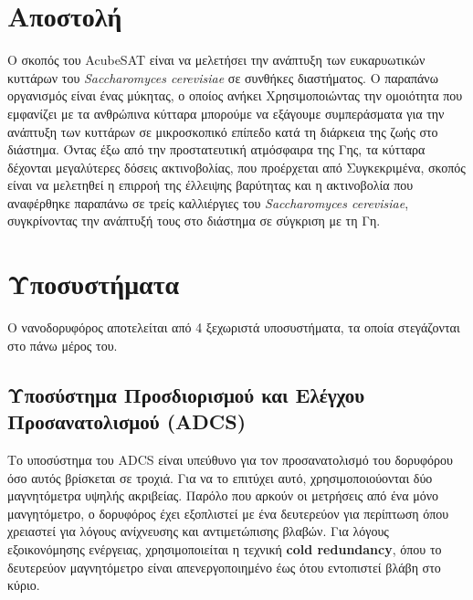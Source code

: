 \documentclass[a4paper,nobib,justified]{tufte-book}
\begin{document}
\section{Αποστολή}
Ο σκοπός του AcubeSAT είναι να μελετήσει την ανάπτυξη των ευκαρυωτικών κυττάρων του \emph{Saccharomyces cerevisiae} σε συνθήκες διαστήματος. Ο παραπάνω οργανισμός είναι ένας μύκητας, ο οποίος ανήκει %
Χρησιμοποιώντας την ομοιότητα που εμφανίζει με τα ανθρώπινα κύτταρα μπορούμε να εξάγουμε συμπεράσματα για την ανάπτυξη των κυττάρων σε μικροσκοπικό επίπεδο κατά τη διάρκεια της ζωής στο διάστημα. Όντας έξω από την προστατευτική ατμόσφαιρα της Γης, τα κύτταρα δέχονται μεγαλύτερες δόσεις ακτινοβολίας, που προέρχεται από %
Συγκεκριμένα, σκοπός είναι να μελετηθεί η επιρροή της έλλειψης βαρύτητας και η ακτινοβολία που αναφέρθηκε παραπάνω σε τρείς καλλιέργιες του \emph{Saccharomyces cerevisiae}, συγκρίνοντας την ανάπτυξή τους στο διάστημα σε σύγκριση με τη Γη.
\section{Υποσυστήματα}
Ο νανοδορυφόρος αποτελείται από 4 ξεχωριστά υποσυστήματα, τα οποία στεγάζονται στο πάνω μέρος του.
\subsection{Υποσύστημα Προσδιορισμού και Ελέγχου Προσανατολισμού (\acs{ADCS})}
Το υποσύστημα του \acs{ADCS} είναι υπεύθυνο για τον προσανατολισμό του δορυφόρου όσο αυτός βρίσκεται σε τροχιά. Για να το επιτύχει αυτό, χρησιμοποιούονται δύο μαγνητόμετρα υψηλής ακριβείας. Παρόλο που αρκούν οι μετρήσεις από ένα μόνο μανγητόμετρο, ο δορυφόρος έχει εξοπλιστεί με ένα δευτερεύον για περίπτωση όπου χρειαστεί για λόγους ανίχνευσης και αντιμετώπισης βλαβών. Για λόγους εξοικονόμησης ενέργειας, χρησιμοποιείται η τεχνική \textbf{cold redundancy}, όπου το δευτερεύον μαγνητόμετρο είναι απενεργοποιημένο έως ότου εντοπιστεί βλάβη στο κύριο.
\end{document}
